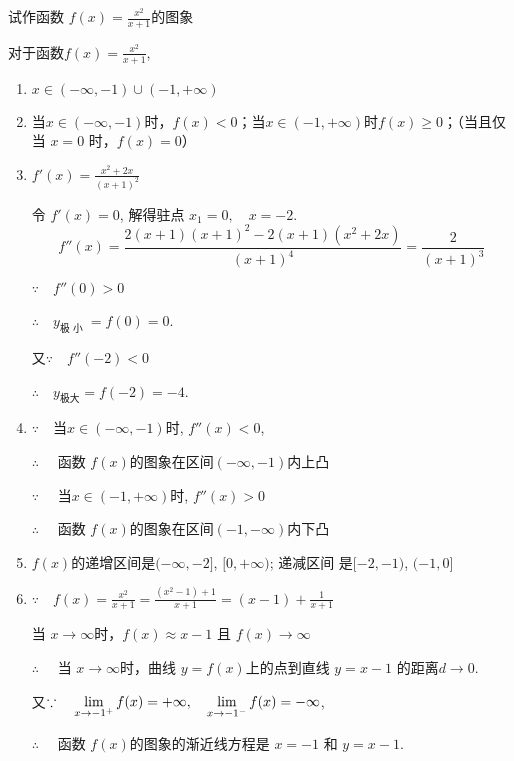 \begin{example}
    试作函数 $f(x)=\frac{x^{2}}{x+1}$的图象
\end{example}

\begin{solution}
    对于函数$f(x)=\frac{x^2}{x+1}$,
\begin{enumerate}[(1)]
    \item $x\in ( - \infty , - 1) \cup ( - 1, + \infty )$ 
    \item 当$x\in(-\infty,-1)$时，$f(x)<0$；当$x\in(-1,+\infty)$时$f(x)\geqslant0$；（当且仅当 $x=0$ 时，$f(x)=0$）
    \item $f'(x)=\frac{x^2+2x}{(x+1)^2}$

令 $f'\left(x\right)=0$, 解得驻点 $x_1=0,\quad x=-2$.
$$f''(x)=\frac{2(x+1)(x+1)^2-2(x+1)(x^2+2x)}{(x+1)^4}=\frac{2}{(x+1)^{3}}$$

$\because\quad f''( 0) > 0$

$\therefore\quad y_{\text{极 小 }}= f( 0) = 0$.

又$\because\quad f'' (-2)<0$

$\therefore\quad  y_{\text{极大}}=f(-2)=-4$.

\item $\because\quad$当$x\in ( - \infty , - 1)$时, $f''( x) < 0$,

$\therefore\quad $ 函数 $f(x)$的图象在区间$(-\infty,-1)$内上凸

$\because\quad $ 当$x\in(-1,+\infty)$时, $f''(x)>0$

$\therefore\quad$ 函数 $f(x)$的图象在区间$(-1,-\infty)$内下凸

\item $f(x)$的递增区间是$(-\infty,-2]$, $[0,+\infty)$; 递减区间
是$[-2,-1)$, $(-1,0]$

\item $\because\quad f( x) = \frac {x^{2}}{x+ 1}= \frac {( x^{2}- 1) + 1}{x+ 1}=(x-1)+\frac{1}{x+1}$

当 $x\to\infty$时，$f(x)\approx x-1$ 且 $f(x)\to\infty$

$\therefore\quad $ 当  $x\to \infty$时，曲线 $y=f(x)$上的点到直线 $y=x-1$
的距离$d\to0$.

又$\because\quad \lim\limits_{x\to - 1^{+}}f( x) = + \infty,\quad \lim\limits_{x\to - 1^{- }}f( x) = - \infty$,

$\therefore\quad $ 函数 $f(x)$的图象的渐近线方程是 $x=-1$ 和
$y=x-1$.


\end{enumerate}
\end{solution}
